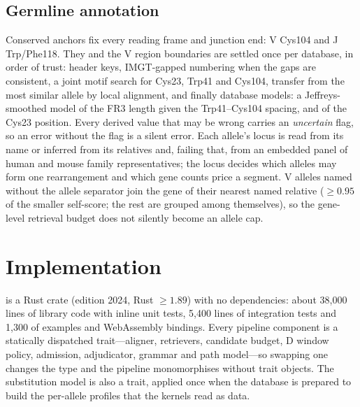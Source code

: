 \documentclass[11pt,a4paper]{article}
\begin{document}
\subsection{Germline annotation}

Conserved anchors fix every reading frame and junction end: V Cys104 and J
Trp/Phe118. They and the V region boundaries are settled once per database,
in order of trust: header keys, IMGT-gapped numbering when the gaps are
consistent, a joint motif search for Cys23, Trp41 and Cys104, transfer from
the most similar allele by local alignment, and finally database models: a
Jeffreys-smoothed model of the FR3 length given the Trp41--Cys104 spacing,
and of the Cys23 position. Every derived value that may be wrong carries an
\emph{uncertain} flag, so an error without the flag is a silent error. Each
allele's locus is read from its name or inferred from its relatives and,
failing that, from an embedded panel of human and mouse family
representatives; the locus decides which alleles may form one
rearrangement and which gene counts price a segment. V alleles named
without the \code{*} allele separator join the gene of their nearest named
relative ($\ge 0.95$ of the smaller self-score; the rest are grouped among
themselves), so the gene-level retrieval budget does not silently become an
allele cap.


\section{Implementation}
\label{sec:implementation}

\swig{} is a Rust crate (edition 2024, Rust $\ge 1.89$) with no dependencies:
about 38,000 lines of library code with inline unit tests, 5,400 lines of
integration tests and 1,300 of examples and WebAssembly bindings. Every
pipeline component is a statically dispatched trait---aligner, retrievers,
candidate budget, D window policy, admission, adjudicator, grammar and path
model---so swapping one changes the type and the pipeline monomorphises
without trait objects. The substitution model is also a trait, applied once
when the database is prepared to build the per-allele profiles that the
kernels read as data.
\end{document}
